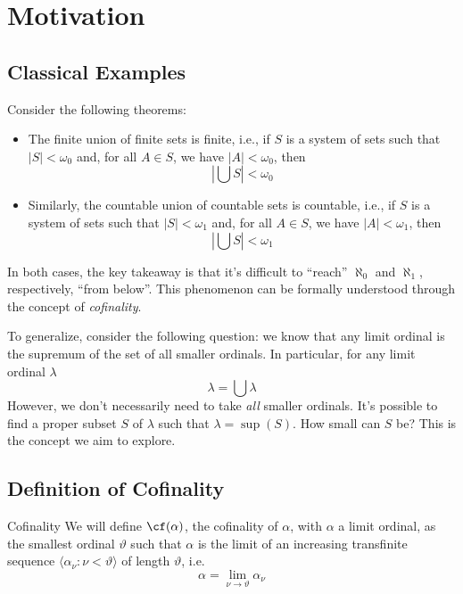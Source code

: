 \chapter{Motivation}

\section{Classical Examples}

Consider the following theorems:

\begin{tcolorbox}[colback=gray!5,colframe=gray!80!black]
    \begin{itemize}[leftmargin=*, nosep]
    \item The finite union of finite sets is finite, i.e., if $S$ is a system of sets such that $|S|<\omega_0$ and, for all $A\in S$, we have $|A|<\omega_0$, then
    $$\left|\bigcup S\right|<\omega_0$$
    \item Similarly, the countable union of countable sets is countable, i.e., if $S$ is a system of sets such that $|S|<\omega_1$ and, for all $A\in S$, we have $|A|<\omega_1$, then
    $$\left|\bigcup S\right|<\omega_1$$
    \end{itemize}
\end{tcolorbox}

In both cases, the key takeaway is that it’s difficult to ``reach'' $\aleph_0$ and $\aleph_1$, respectively, ``from below''. This phenomenon can be formally understood through the concept of \textit{cofinality}.

To generalize, consider the following question: we know that any limit ordinal is the supremum of the set of all smaller ordinals. In particular, for any limit ordinal $\lambda$
$$\lambda=\bigcup\lambda$$
However, we don’t necessarily need to take \textit{all} smaller ordinals. It’s possible to find a proper subset $S$ of $\lambda$ such that $\lambda=\sup(S)$. How small can $S$ be? This is the concept we aim to explore.

\section{Definition of Cofinality}

\begin{definition}{Cofinality}{}
    We will define $\cf(\alpha)$, the \textcolor{laser_eyes!80!black}{cofinality} of $\alpha$, with $\alpha$ a limit ordinal, as the smallest ordinal $\vartheta$ such that $\alpha$ is the limit of an increasing transfinite sequence $\langle\alpha_\nu:\nu<\vartheta\rangle$ of length $\vartheta$, i.e.
    $$\alpha=\lim_{\nu\to\vartheta}\alpha_\nu$$
\end{definition}

